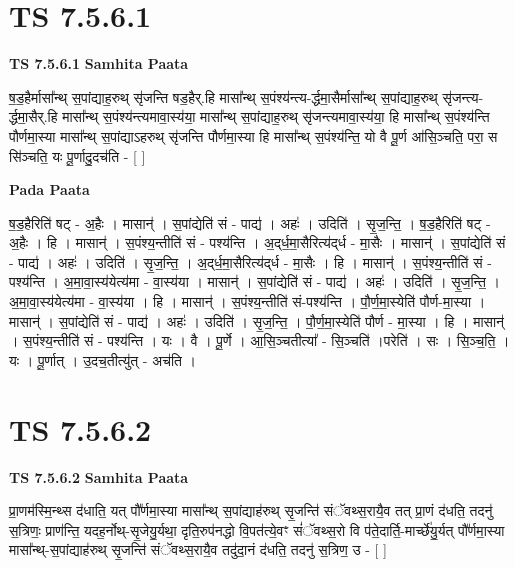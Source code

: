 \documentclass[17pt]{extarticle}
\begin{document}
\section{ TS 7.5.6.1 }

\textbf{TS 7.5.6.1 } \newline
\textbf{Samhita Paata} \newline

ष॒ड॒हैर्मासा᳚न्थ् स॒पांद्याह॒रुथ् सृ॑जन्ति षड॒हैर्.हि मासा᳚न्थ् स॒पंश्य॑न्त्य-र्द्धमा॒सैर्मासा᳚न्थ् स॒पांद्याह॒रुथ् सृ॑जन्त्य-र्द्धमा॒सैर्.हि मासा᳚न्थ् स॒पंश्य॑न्त्यमावा॒स्य॑या॒ मासा᳚न्थ् स॒पांद्याह॒रुथ् सृ॑जन्त्यमावा॒स्य॑या॒ हि मासा᳚न्थ् स॒पंश्य॑न्ति पौर्णमा॒स्या मासा᳚न्थ् स॒पांद्याऽहरुथ् सृ॑जन्ति पौर्णमा॒स्या हि मासा᳚न्थ् स॒पंश्य॑न्ति॒ यो वै पू॒र्ण आ॑सि॒ञ्चति॒ परा॒ स सि॑ञ्चति॒ यः पू॒र्णादु॒दच॑ति - [  ] \newline

\textbf{Pada Paata} \newline

ष॒ड॒हैरिति॑ षट् - अ॒हैः । मासान्॑ । स॒पांद्येति॑ सं - पाद्य॑ । अहः॑ । उदिति॑ । सृ॒ज॒न्ति॒ । ष॒ड॒हैरिति॑ षट् - अ॒हैः । हि । मासान्॑ । स॒पंश्य॒न्तीति॑ सं - पश्य॑न्ति । अ॒द्‌र्ध॒मा॒सैरित्य॑द्‌र्ध - मा॒सैः । मासान्॑ । स॒पांद्येति॑ सं - पाद्य॑ । अहः॑ । उदिति॑ । सृ॒ज॒न्ति॒ । अ॒द्‌र्ध॒मा॒सैरित्य॑द्‌र्ध - मा॒सैः । हि । मासान्॑ । स॒पंश्य॒न्तीति॑ सं - पश्य॑न्ति । अ॒मा॒वा॒स्य॑येत्य॑मा - वा॒स्य॑या । मासान्॑ । स॒पांद्येति॑ सं - पाद्य॑ । अहः॑ । उदिति॑ । सृ॒ज॒न्ति॒ । अ॒मा॒वा॒स्य॑येत्य॑मा - वा॒स्य॑या । हि । मासान्॑ । स॒पंश्य॒न्तीति॑ सं-पश्य॑न्ति । पौ॒र्ण॒मा॒स्येति॑ पौर्ण-मा॒स्या । मासान्॑ । स॒पांद्येति॑ सं - पाद्य॑ । अहः॑ । उदिति॑ । सृ॒ज॒न्ति॒ । पौ॒र्ण॒मा॒स्येति॑ पौर्ण - मा॒स्या । हि । मासान्॑ । स॒पंश्य॒न्तीति॑ सं - पश्य॑न्ति । यः । वै । पू॒र्णे । आ॒सि॒ञ्चतीत्या᳚ - सि॒ञ्चति॑ ।परेति॑ । सः । सि॒ञ्च॒ति॒ । यः । पू॒र्णात् । उ॒दच॒तीत्यु॑त् - अच॑ति ।  \newline





\section{ TS 7.5.6.2 }

\textbf{TS 7.5.6.2 } \newline
\textbf{Samhita Paata} \newline

प्रा॒णम॑स्मि॒न्थ्स द॑धाति॒ यत् पौ᳚र्णमा॒स्या मासा᳚न्थ् स॒पांद्याह॑रुथ् सृ॒जन्ति॑ संॅवथ्स॒रायै॒व तत् प्रा॒णं द॑धति॒ तदनु॑ स॒त्रिणः॒ प्राण॑न्ति॒ यदह॒र्नोथ्-सृ॒जेयु॒र्यथा॒ दृति॒रुप॑नद्धो वि॒पत॑त्ये॒वꣳ सं॑ॅवथ्स॒रो वि प॑ते॒दार्ति॒-मार्च्छे॑यु॒र्यत् पौ᳚र्णमा॒स्या मासा᳚न्थ्-स॒पांद्याह॑रुथ् सृ॒जन्ति॑ संॅवथ्स॒रायै॒व तदु॑दा॒नं द॑धति॒ तदनु॑ स॒त्रिण॒ उ - [  ] \newline
\end{document}
